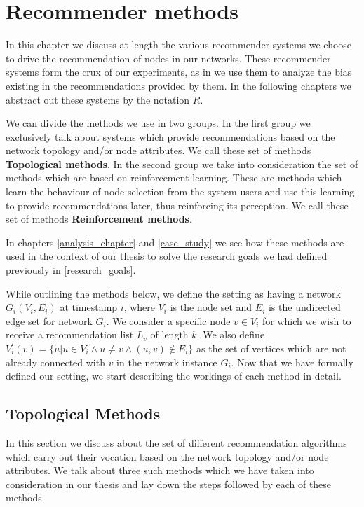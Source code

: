 \chapter{Recommender methods}
\label{recommender_methods}
\thispagestyle{empty}

In this chapter we discuss at length the various recommender systems we choose to drive the recommendation of nodes in our networks. These recommender systems form the crux of our experiments, as in we use them to analyze the bias existing in the recommendations provided by them. In the following chapters we abstract out these systems by the notation $R$.

We can divide the methods we use in two groups. In the first group we exclusively talk about systems which provide recommendations based on the network topology and/or node attributes. We call these set of methods \textbf{Topological methods}. In the second group we take into consideration the set of methods which are based on reinforcement learning. These are methods which learn the behaviour of node selection from the system users and use this learning to provide recommendations later, thus reinforcing its perception. We call these set of methods \textbf{Reinforcement methods}.

In chapters \ref{analysis_chapter} and \ref{case_study} we see how these methods are used in the context of our thesis to solve the research goals we had defined previously in \ref{research_goals}. 

While outlining the methods below, we define the setting as having a network $G_{i}(V_{i}, E_{i})$ at timestamp $i$, where $V_{i}$ is the node set and $E_{i}$ is the undirected edge set for network $G_{i}$. We consider a specific node $v \in V_{i}$ for which we wish to receive a recommendation list $L_{v}$ of length $k$. We also define $V^{\prime}_{i}(v)=\{u | u \in V_{i} \land u \ne v \land (u,v) \notin E_{i}\}$ as the set of vertices which are not already connected with $v$ in the network instance $G_{i}$. Now that we have formally defined our setting, we start describing the workings of each method in detail. 

\section{Topological Methods}
In this section we discuss about the set of different recommendation algorithms which carry out their vocation based on the network topology and/or node attributes. We talk about three such methods which we have taken into consideration in our thesis and lay down the steps followed by each of these methods. 

